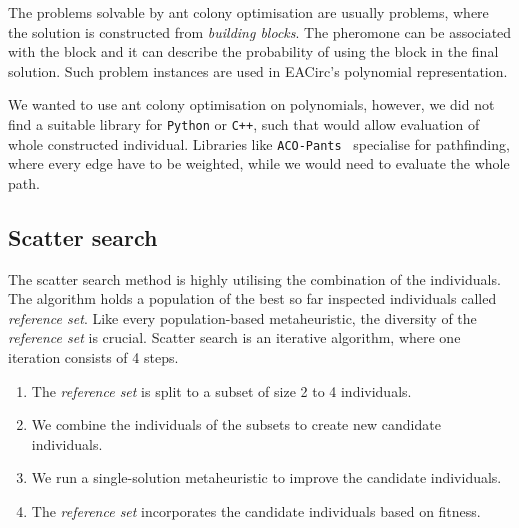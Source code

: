 \documentclass[
  print, %
  Table,   %
  nolof,     %
  nolot,     %
  11pt, %
  oneside  %
]{fithesis3}
\begin{document}
The problems solvable by ant colony optimisation are usually problems, where the solution is constructed from \textit{building blocks}. The pheromone can be associated with the block and it can describe the probability of using the block in the final solution. Such problem instances are used in EACirc's polynomial representation.

We wanted to use ant colony optimisation on polynomials, however, we did not find a suitable library for \texttt{Python} or \texttt{C++}, such that would allow evaluation of whole constructed individual. Libraries like \texttt{ACO-Pants}~\cite{acoPants} specialise for pathfinding, where every edge have to be weighted, while we would need to evaluate the whole path.

\subsection{Scatter search}
\label{subsec:opt-multi-sol-scatter}

The scatter search method is highly utilising the combination of the individuals. The algorithm holds a population of the best so far inspected individuals called \textit{reference set}. Like every population-based metaheuristic, the diversity of the \textit{reference set} is crucial. Scatter search is an iterative algorithm, where one iteration consists of 4 steps.

\begin{enumerate}
    \item The \textit{reference set} is split to a subset of size 2 to 4 individuals.
    \item We combine the individuals of the subsets to create new candidate individuals.
    \item We run a single-solution metaheuristic to improve the candidate individuals.
    \item The \textit{reference set} incorporates the candidate individuals based on fitness.
\end{enumerate}
\end{document}
